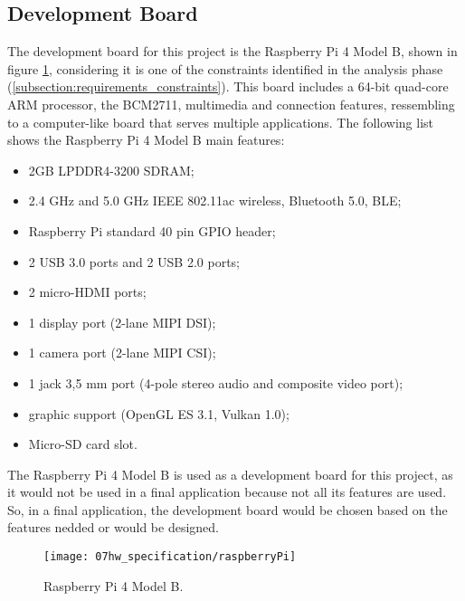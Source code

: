 \subsection{Development Board}

The development board for this project is the Raspberry Pi 4 Model B, shown in figure \ref{fig:rasp}, considering it is one of the constraints identified in the analysis phase (\ref{subsection:requirements_constraints}). This board includes a 64-bit quad-core ARM processor, the BCM2711, multimedia and connection features, ressembling to a computer-like board that serves multiple applications. The following list shows the Raspberry Pi 4 Model B main features:

\begin{itemize}
        \item 2GB LPDDR4-3200 SDRAM;
        \item 2.4 GHz and 5.0 GHz IEEE 802.11ac wireless, Bluetooth 5.0, BLE;
        \item Raspberry Pi standard 40 pin GPIO header;   
        \item 2 USB 3.0 ports and 2 USB 2.0 ports;
        \item 2 micro-HDMI ports;
        \item 1 display port (2-lane MIPI DSI);
        \item 1 camera port (2-lane MIPI CSI);
        \item 1 jack 3,5 mm port (4-pole stereo audio and composite video port);
		\item graphic support (OpenGL ES 3.1, Vulkan 1.0);
		\item Micro-SD card slot.
\end{itemize}

The Raspberry Pi 4 Model B is used as a development board for this project, as it would not be used in a final application because not all its features are used. So, in a final application, the development board would be chosen based on the features nedded or would be designed.


\begin{figure}[H]
	\centering
	\texttt{[image: 07hw\_specification/raspberryPi]}
	\caption{Raspberry Pi 4 Model B.}
	\label{fig:rasp}
\end{figure}

